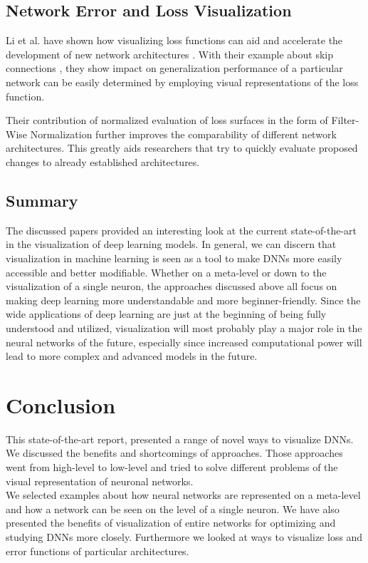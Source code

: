 \documentclass{acmsiggraph}               %
\begin{document}
\subsection{Network Error and Loss Visualization}

Li et al. have shown how visualizing loss functions can aid and accelerate the development of new network architectures \cite{Li2017}.
With their example about skip connections \cite{He2015}, they show impact on generalization performance of a particular network can be easily determined by employing visual representations of the loss function.

Their contribution of normalized evaluation of loss surfaces in the form of Filter-Wise Normalization further improves the comparability of different network architectures. This greatly aids researchers that try to quickly evaluate proposed changes to already established architectures.

\subsection{Summary}
The discussed papers provided an interesting look at the current state-of-the-art in the visualization of deep learning models. In general, we can discern that visualization in machine learning is seen as a tool to make DNNs more easily accessible and better modifiable. Whether on a meta-level or down to the visualization of a single neuron, the approaches discussed above all focus on making deep learning more understandable and more beginner-friendly. Since the wide applications of deep learning are just at the beginning of being fully understood and utilized, visualization will most probably play a major role in the neural networks of the future, especially since increased computational power will lead to more complex and advanced models in the future.

\section{Conclusion}
This state-of-the-art report, presented a range of novel ways to visualize DNNs. We discussed the benefits and shortcomings of approaches. Those approaches went from high-level to low-level and tried to solve different problems of the visual representation of neuronal networks.\\
We selected examples about how neural networks are represented on a meta-level and how a network can be seen on the level of a single neuron. We have also presented the benefits of visualization of entire networks for optimizing and studying DNNs more closely. Furthermore we looked at ways to visualize loss and error functions of particular architectures.\\
\end{document}
